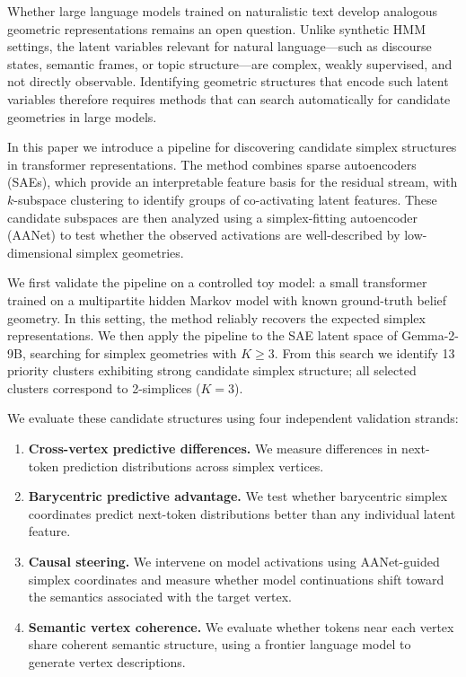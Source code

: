 \documentclass{article}
\begin{document}
Whether large language models trained on naturalistic text develop analogous geometric representations remains an open question.  Unlike
synthetic HMM settings, the latent variables relevant for natural language---such as discourse states, semantic frames, or topic
structure---are complex, weakly supervised, and not directly observable.  Identifying geometric structures that encode such latent
variables therefore requires methods that can search automatically for candidate geometries in large models.

In this paper we introduce a pipeline for discovering candidate simplex structures in transformer representations.  The method
combines sparse autoencoders (SAEs), which provide an interpretable feature basis for the residual stream, with $k$-subspace clustering to
identify groups of co-activating latent features.  These candidate subspaces are then analyzed using a simplex-fitting autoencoder
(AANet) to test whether the observed activations are well-described by low-dimensional simplex geometries.

We first validate the pipeline on a controlled toy model: a small transformer trained on a multipartite hidden Markov model with known
ground-truth belief geometry.  In this setting, the method reliably recovers the expected simplex representations.  We then apply the
pipeline to the SAE latent space of Gemma-2-9B, searching for simplex geometries with $K \ge 3$.  From this search we identify 13 priority
clusters exhibiting strong candidate simplex structure; all selected clusters correspond to 2-simplices ($K = 3$).

We evaluate these candidate structures using four independent validation strands:
\begin{enumerate}
\item \textbf{Cross-vertex predictive differences.} We measure differences in next-token
prediction distributions across simplex vertices.

\item \textbf{Barycentric predictive advantage.} We test whether barycentric simplex
coordinates predict next-token distributions better than any individual latent feature.

\item \textbf{Causal steering.} We intervene on model activations using AANet-guided
simplex coordinates and measure whether model continuations shift toward the
semantics associated with the target vertex.

\item \textbf{Semantic vertex coherence.} We evaluate whether tokens near each vertex
share coherent semantic structure, using a frontier language model to generate
vertex descriptions.
\end{enumerate}
\end{document}
